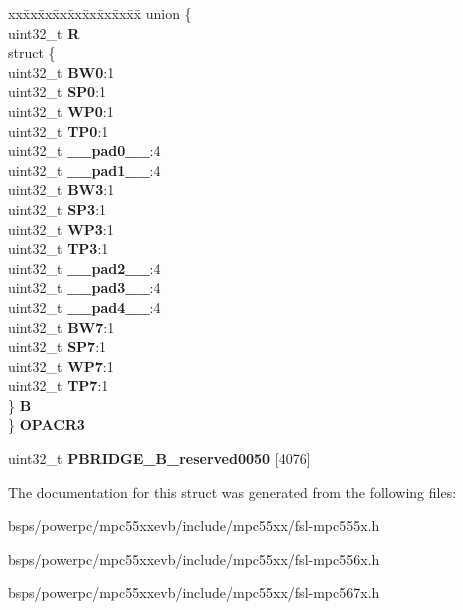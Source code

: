 \begin{DoxyCompactItemize}
\begin{tabbing}
\end{tabbing}\item 
\mbox{\label{structPBRIDGE__B__tag_a36fa9154c4cb4293021394fe9a039f46}} 
\begin{tabbing}
xx\=xx\=xx\=xx\=xx\=xx\=xx\=xx\=xx\=\kill
union \{\\
\>uint32\_t {\bfseries R}\\
\>struct \{\\
\>\>uint32\_t {\bfseries BW0}:1\\
\>\>uint32\_t {\bfseries SP0}:1\\
\>\>uint32\_t {\bfseries WP0}:1\\
\>\>uint32\_t {\bfseries TP0}:1\\
\>\>uint32\_t {\bfseries \_\_pad0\_\_}:4\\
\>\>uint32\_t {\bfseries \_\_pad1\_\_}:4\\
\>\>uint32\_t {\bfseries BW3}:1\\
\>\>uint32\_t {\bfseries SP3}:1\\
\>\>uint32\_t {\bfseries WP3}:1\\
\>\>uint32\_t {\bfseries TP3}:1\\
\>\>uint32\_t {\bfseries \_\_pad2\_\_}:4\\
\>\>uint32\_t {\bfseries \_\_pad3\_\_}:4\\
\>\>uint32\_t {\bfseries \_\_pad4\_\_}:4\\
\>\>uint32\_t {\bfseries BW7}:1\\
\>\>uint32\_t {\bfseries SP7}:1\\
\>\>uint32\_t {\bfseries WP7}:1\\
\>\>uint32\_t {\bfseries TP7}:1\\
\>\} {\bfseries B}\\
\} {\bfseries OPACR3}\\

\end{tabbing}\item 
\mbox{\label{structPBRIDGE__B__tag_aeb8fe3b1cf33dd680a54d8a232c46775}} 
uint32\+\_\+t {\bfseries P\+B\+R\+I\+D\+G\+E\+\_\+\+B\+\_\+reserved0050} \mbox{[}4076\mbox{]}
\end{DoxyCompactItemize}


The documentation for this struct was generated from the following files\+:\begin{DoxyCompactItemize}
\item 
bsps/powerpc/mpc55xxevb/include/mpc55xx/fsl-\/mpc555x.\+h\item 
bsps/powerpc/mpc55xxevb/include/mpc55xx/fsl-\/mpc556x.\+h\item 
bsps/powerpc/mpc55xxevb/include/mpc55xx/fsl-\/mpc567x.\+h\end{DoxyCompactItemize}
